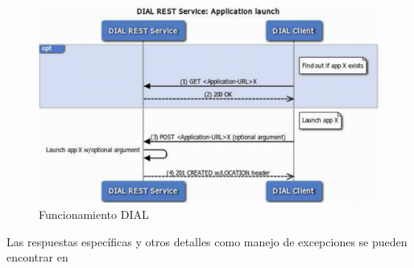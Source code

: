 \begin{figure}[H]
	\centering
	\includegraphics[scale=0.5]{./Imagenes/dialrest.png}
	\caption{Funcionamiento DIAL}
	\label{fig:DIAL}
\end{figure}


Las respuestas específicas y otros detalles como manejo de excepciones se pueden encontrar en \cite{dial}


